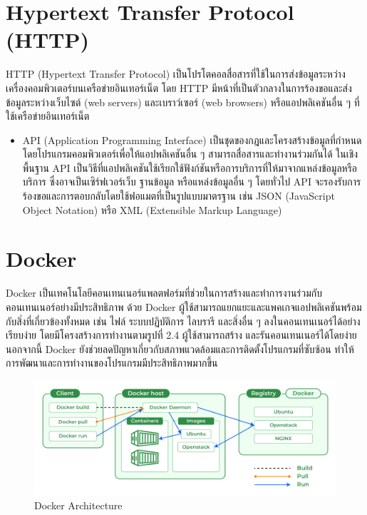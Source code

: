 \section{Hypertext Transfer Protocol (HTTP)}
HTTP (Hypertext Transfer Protocol) เป็นโปรโตคอลสื่อสารที่ใช้ในการส่งข้อมูลระหว่างเครื่องคอมพิวเตอร์บนเครือข่ายอินเทอร์เน็ต โดย HTTP 
มีหน้าที่เป็นตัวกลางในการร้องขอและส่งข้อมูลระหว่างเว็บไซต์ (web servers) และเบราว์เซอร์ (web browsers) หรือแอปพลิเคชันอื่น ๆ 
ที่ใช้เครือข่ายอินเทอร์เน็ต 
\begin{itemize}
  \item API (Application Programming Interface) เป็นชุดของกฎและโครงสร้างข้อมูลที่กำหนดโดยโปรแกรมคอมพิวเตอร์เพื่อให้แอปพลิเคชันอื่น ๆ 
  สามารถสื่อสารและทำงานร่วมกันได้ ในเชิงพื้นฐาน API เป็นวิธีที่แอปพลิเคชันใช้เรียกใช้ฟังก์ชันหรือการบริการที่ให้มาจากแหล่งข้อมูลหรือบริการ
  ซึ่งอาจเป็นเซิร์ฟเวอร์เว็บ ฐานข้อมูล หรือแหล่งข้อมูลอื่น ๆ โดยทั่วไป API จะรองรับการร้องขอและการตอบกลับโดยใช้ฟอแมตที่เป็นรูปแบบมาตรฐาน เช่น 
  JSON (JavaScript Object Notation) หรือ XML (Extensible Markup Language) 
\end{itemize}

\section{Docker}
Docker \cite{docker} เป็นเทคโนโลยีคอนเทนเนอร์แพลตฟอร์มที่ช่วยในการสร้างและทำการงานร่วมกับคอนเทนเนอร์อย่างมีประสิทธิภาพ ด้วย Docker 
ผู้ใช้สามารถแยกแยะและแพคเกจแอปพลิเคชันพร้อมกับสิ่งที่เกี่ยวข้องทั้งหมด เช่น ไฟล์ ระบบปฏิบัติการ ไลบรารี และสิ่งอื่น ๆ 
ลงในคอนเทนเนอร์ได้อย่างเรียบง่าย โดยมีโครงสร้างการทำงานตามรูปที่ 2.4 ผู้ใช้สามารถสร้าง และรันคอนเทนเนอร์ได้โดยง่าย นอกจากนี้ Docker 
ยังช่วยลดปัญหาเกี่ยวกับสภาพแวดล้อมและการติดตั้งโปรแกรมที่ซับซ้อน ทำให้การพัฒนาและการทำงานของโปรแกรมมีประสิทธิภาพมากขึ้น 
\begin{figure}[h]
  \begin{center}
  \includegraphics[scale=0.3]{resources/Docker.png}
  \end{center}
  \caption[Docker Architecture]{Docker Architecture}
  \label{fig:docker}
\end{figure}

